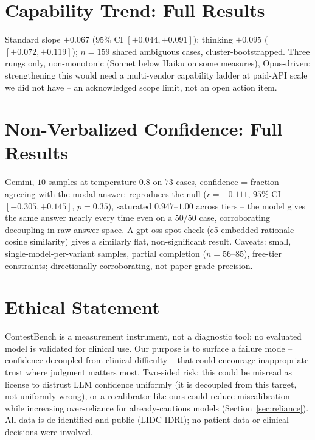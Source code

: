 \documentclass[letterpaper]{article} %
\begin{document}
\section{Capability Trend: Full Results}
\label{app:capability}
Standard slope $+0.067$ ($95\%$ CI $[+0.044,+0.091]$); thinking $+0.095$
($[+0.072,+0.119]$); $n{=}159$ shared ambiguous cases, cluster-bootstrapped.
Three rungs only, non-monotonic (Sonnet below Haiku on some measures),
Opus-driven; strengthening this would need a multi-vendor capability ladder
at paid-API scale we did not have -- an acknowledged scope limit, not an
open action item.

\section{Non-Verbalized Confidence: Full Results}
\label{app:consistency}
Gemini, $10$ samples at temperature $0.8$ on $73$ cases, confidence =
fraction agreeing with the modal answer: reproduces the null ($r{=}-0.111$,
$95\%$ CI $[-0.305,+0.145]$, $p{=}0.35$), saturated $0.947$--$1.00$ across
tiers -- the model gives the same answer nearly every time even on a
$50/50$ case, corroborating decoupling in raw answer-space. A gpt-oss
spot-check (e5-embedded rationale cosine similarity) gives a similarly
flat, non-significant result. Caveats: small, single-model-per-variant
samples, partial completion ($n{=}56$--$85$), free-tier constraints;
directionally corroborating, not paper-grade precision.

\section*{Ethical Statement}
ContestBench is a measurement instrument, not a diagnostic tool; no
evaluated model is validated for clinical use. Our purpose is to surface a
failure mode -- confidence decoupled from clinical difficulty -- that could
encourage inappropriate trust where judgment matters most. Two-sided risk:
this could be misread as license to distrust LLM confidence uniformly (it
is decoupled from this target, not uniformly wrong), or a recalibrator like
ours could reduce miscalibration while increasing over-reliance for
already-cautious models (Section~\ref{sec:reliance}). All data is
de-identified and public (LIDC-IDRI); no patient data or clinical
decisions were involved.


\end{document}
